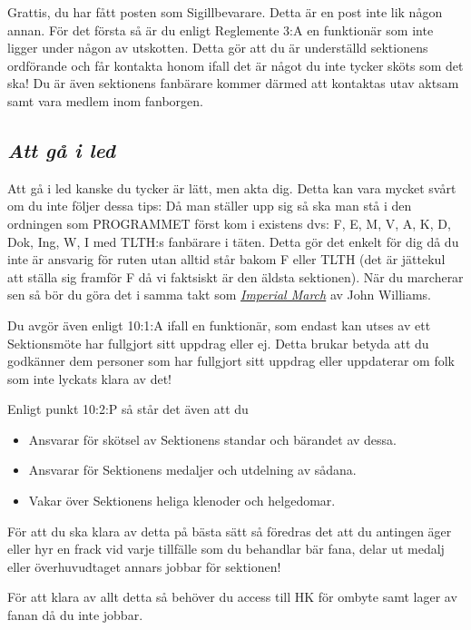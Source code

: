 \documentclass[10pt]{article}
\begin{document}
    \heading{\doctitle}

    Grattis, du har fått posten som Sigillbevarare. Detta är en post inte lik någon annan. För det första så är du enligt Reglemente 3:A en funktionär som inte ligger under någon av utskotten. Detta gör att du är underställd sektionens ordförande och får kontakta honom ifall det är något du inte tycker sköts som det ska!  Du är även sektionens fanbärare kommer därmed att kontaktas utav aktsam samt vara medlem inom fanborgen.
    
    \subsection*{\textit{Att gå i led}}
    Att gå i led kanske du tycker är lätt, men akta dig. Detta kan vara mycket svårt om du inte följer dessa tips:\newline
    Då man ställer upp sig så ska man stå i den ordningen som PROGRAMMET först kom i existens dvs: F, E, M, V, A, K, D, Dok, Ing, W, I med TLTH:s fanbärare i täten. Detta gör det enkelt för dig då du inte är ansvarig för ruten utan alltid står bakom F eller TLTH (det är jättekul att ställa sig framför F då vi faktsiskt är den äldsta sektionen). 
    När du marcherar sen så bör du göra det i samma takt som \href{https://open.spotify.com/track/2bw4WgXyXP90hIex7ur58y?si=9prL8IZeQNK79MJN6Nj0Mg}{\textit{Imperial March}} av John Williams.

    Du avgör även enligt 10:1:A ifall en funktionär, som endast kan utses av ett Sektionsmöte har fullgjort sitt uppdrag eller ej. Detta brukar betyda att du godkänner dem personer som har fullgjort sitt uppdrag eller uppdaterar om folk som inte lyckats klara av det!

    Enligt punkt 10:2:P så står det även att du
    \begin{itemize}
        \item Ansvarar för skötsel av Sektionens standar och bärandet av dessa.
        \item Ansvarar för Sektionens medaljer och utdelning av sådana.
        \item Vakar över Sektionens heliga klenoder och helgedomar.
    \end{itemize}

    För att du ska klara av detta på bästa sätt så föredras det att du antingen äger eller hyr en frack vid varje tillfälle som du behandlar bär fana, delar ut medalj eller överhuvudtaget annars jobbar för sektionen!

    För att klara av allt detta så behöver du access till HK för ombyte samt lager av fanan då du inte jobbar.
    
        
   
\end{document}
